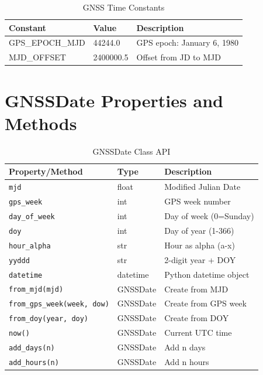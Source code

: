\documentclass[11pt,a4paper,twoside]{report}
\newcommand{\code}[1]{\texttt{\small\color{primaryblue}#1}}
\begin{document}
\begin{table}[H]
\centering
\caption{GNSS Time Constants}
\label{tab:time-constants}
\begin{tabular}{@{}llp{5cm}@{}}
\toprule
\textbf{Constant} & \textbf{Value} & \textbf{Description} \\
\midrule
GPS\_EPOCH\_MJD & 44244.0 & GPS epoch: January 6, 1980 \\
MJD\_OFFSET & 2400000.5 & Offset from JD to MJD \\
\bottomrule
\end{tabular}
\end{table}

\section{GNSSDate Properties and Methods}

\begin{table}[H]
\centering
\caption{GNSSDate Class API}
\label{tab:gnssdate-api}
\begin{tabular}{@{}llp{5cm}@{}}
\toprule
\textbf{Property/Method} & \textbf{Type} & \textbf{Description} \\
\midrule
\code{mjd} & float & Modified Julian Date \\
\code{gps\_week} & int & GPS week number \\
\code{day\_of\_week} & int & Day of week (0=Sunday) \\
\code{doy} & int & Day of year (1-366) \\
\code{hour\_alpha} & str & Hour as alpha (a-x) \\
\code{yyddd} & str & 2-digit year + DOY \\
\code{datetime} & datetime & Python datetime object \\
\midrule
\code{from\_mjd(mjd)} & GNSSDate & Create from MJD \\
\code{from\_gps\_week(week, dow)} & GNSSDate & Create from GPS week \\
\code{from\_doy(year, doy)} & GNSSDate & Create from DOY \\
\code{now()} & GNSSDate & Current UTC time \\
\code{add\_days(n)} & GNSSDate & Add n days \\
\code{add\_hours(n)} & GNSSDate & Add n hours \\
\bottomrule
\end{tabular}
\end{table}
\end{document}
